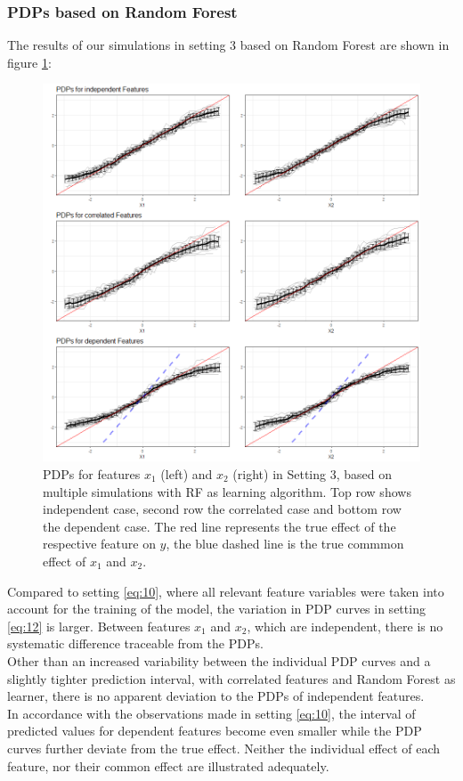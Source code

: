 \documentclass[]{krantz}
\begin{document}
\subsubsection{PDPs based on Random
Forest}\label{pdps-based-on-random-forest-2}

The results of our simulations in setting 3 based on Random Forest are
shown in figure \ref{fig:Figure20}:

\begin{figure}

\includegraphics[width=1\linewidth]{images/VK_PDP_20_Set3_RF} \hfill{}

\caption{PDPs for features $x_1$ (left) and $x_2$  (right) in Setting 3, based on multiple simulations with RF as learning algorithm. Top row shows independent case, second row the correlated case and bottom row the dependent case. The red line represents the true effect of the respective feature on $y$, the blue dashed line is the true commmon effect of $x_1$ and $x_2$.}\label{fig:Figure20}
\end{figure}

Compared to setting \eqref{eq:10}, where all relevant feature variables
were taken into account for the training of the model, the variation in
PDP curves in setting \eqref{eq:12} is larger. Between features \(x_1\)
and \(x_2\), which are independent, there is no systematic difference
traceable from the PDPs.\\
Other than an increased variability between the individual PDP curves
and a slightly tighter prediction interval, with correlated features and
Random Forest as learner, there is no apparent deviation to the PDPs of
independent features.\\
In accordance with the observations made in setting \eqref{eq:10}, the
interval of predicted values for dependent features become even smaller
while the PDP curves further deviate from the true effect. Neither the
individual effect of each feature, nor their common effect are
illustrated adequately.
\end{document}

